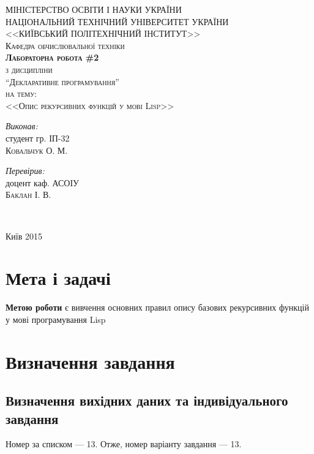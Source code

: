\documentclass[a4paper, 12pt]{extarticle}
\begin{document}
\begin{titlepage}
  \thispagestyle{empty}
  \center
  \textsc{\uppercase{Міністерство освіти і науки України\\Національний технічний університет України\\<<Київський політехнічний інститут>>}}\\[1cm]
  \textsc{Кафедра обчислювальної техніки}\\[0.5cm]
  \vfill
  \textsc{\Large \textbf{Лабораторна робота \#2}}\\
  \textsc{з дисципліни}\\
  \textsc{\large ``Декларативне програмування''}\\
  \textsc{на тему:}\\
  \textsc{\Large <<Опис рекурсивних функцій у мові Lisp>>}\\
  \vspace{3cm}
  \begin{minipage}{0.4\textwidth}
    \begin{flushleft} \large
      \emph{Виконав:}\\
      студент гр. ІП-32 \\
      \textsc{Ковальчук О. М.} %
    \end{flushleft}
  \end{minipage}
  \begin{minipage}{0.4\textwidth}
    \begin{flushright} \large
      \emph{Перевірив:} \\
      доцент каф. АСОІУ \\
      \textsc{Баклан І. В.} %
    \end{flushright}
  \end{minipage}\\[4cm]
  \vfill

  Київ 2015
\end{titlepage}
\setcounter{page}{2}
\section{Мета і задачі}
\textbf{Метою роботи} є вивчення основних правил опису базових рекурсивних функцій у мові програмування Lisp
\section{Визначення завдання}
\subsection{Визначення вихідних даних та індивідуального завдання}
Номер за списком --- 13. Отже, номер варіанту завдання --- 13.
\end{document}
